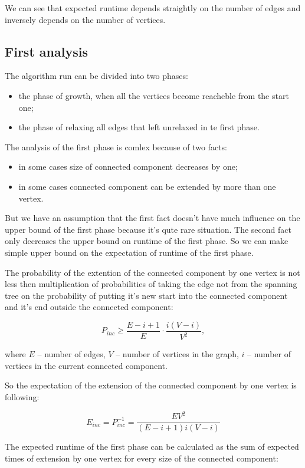 \documentclass{llncs}
\begin{document}
  We can see that expected runtime depends straightly on the number of edges and inversely depends on the number of vertices.
  
 \subsection{First analysis}
  The algorithm run can be divided into two phases:
  \begin{itemize}
   \item the phase of growth, when all the vertices become reacheble from the start one;
   \item the phase of relaxing all edges that left unrelaxed in te first phase.
  \end{itemize}

  The analysis of the first phase is comlex because of two facts:
  \begin{itemize}
   \item in some cases size of connected component decreases by one;
   \item in some cases connected component can be extended by more than one vertex.
  \end{itemize}
  
  But we have an assumption that the first fact doesn't have much influence on the upper bound of the first phase because it's qute rare situation.
  The second fact only decreases the upper bound on runtime of the first phase.
  So we can make simple upper bound on the expectation of runtime of the first phase.
  
  The probability of the extention of the connected component by one vertex is not less then multiplication of probabilities 
  of taking the edge not from the spanning tree on the probability of putting it's new start into the connected component and it's end outside the connected component:
  
  $$P_{inc} \ge \frac{E - i + 1}{E} \cdot \frac{i(V - i)}{V^2},$$
  
  where $E$ -- number of edges, $V$ -- number of vertices in the graph, $i$ -- number of vertices in the current connected component.
  
  
  So the expectation of the extension of the connected component by one vertex is following:
  
  $$E_{inc} = P_{inc}^{-1} = \frac{EV^2}{(E - i + 1)i(V - i)}$$
  
  The expected runtime of the first phase can be calculated as the sum of expected times of extension by one vertex for every size of the connected component:
  
\end{document}
